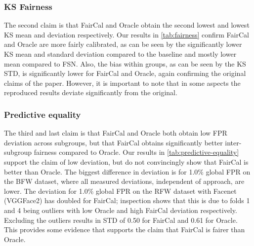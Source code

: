 


\subsubsection{KS Fairness}  %
The second claim is that FairCal and Oracle obtain the second lowest and lowest KS mean and deviation respectively. 
Our results in \autoref{tab:fairness} confirm FairCal and Oracle are more fairly calibrated, as can be seen by the significantly lower KS mean and standard deviation compared to the baseline and mostly lower mean compared to FSN.
Also, the bias within groups, as can be seen by the KS STD, is significantly lower for FairCal and Oracle, again confirming the original claims of the paper.
However, it is important to note that in some aspects the reproduced results deviate significantly from the original.%




\subsubsection{Predictive equality}  %
The third and last claim is that FairCal and Oracle both obtain low FPR deviation across subgroups, but that FairCal obtains significantly better inter-sub\-group fairness compared to Oracle.
Our results in \autoref{tab:predictive-equality} support the claim of low deviation, but do not convincingly show that FairCal is better than Oracle.
The biggest difference in deviation is for 1.0\% global FPR on the BFW dataset, where all measured deviations, independent of approach, are lower.
The deviation for 1.0\% global FPR on the RFW dataset with Facenet (VGGFace2) has doubled for FairCal; inspection shows that this is due to folds 1 and 4 being outliers with low Oracle and high FairCal deviation respectively.
Excluding the outliers results in STD of 0.50 for FairCal and 0.61 for Oracle.
This provides some evidence that supports the claim that FairCal is fairer than Oracle.








